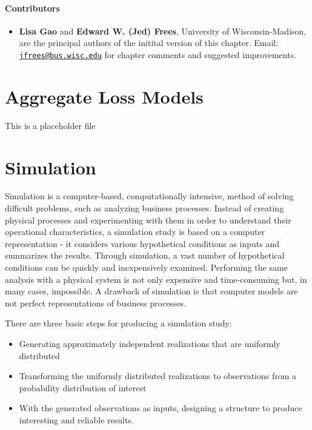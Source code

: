 \documentclass[]{book}
\providecommand{\tightlist}{%
  \setlength{\itemsep}{0pt}\setlength{\parskip}{0pt}}
\theoremstyle{definition}
\theoremstyle{definition}
\theoremstyle{definition}
\theoremstyle{remark}
\begin{document}
\subsubsection*{Contributors}\label{contributors-1}

\begin{itemize}
\tightlist
\item
  \textbf{Lisa Gao} and \textbf{Edward W. (Jed) Frees}, University of
  Wisconsin-Madison, are the principal authors of the initital version
  of this chapter. Email:
  \href{mailto:jfrees@bus.wisc.edu}{\nolinkurl{jfrees@bus.wisc.edu}} for
  chapter comments and suggested improvements.
\end{itemize}

\chapter{Aggregate Loss Models}\label{C:AggLoss}

This is a placeholder file

\chapter{Simulation}\label{simulation}

Simulation is a computer-based, computationally intensive, method of
solving difficult problems, such as analyzing business processes.
Instead of creating physical processes and experimenting with them in
order to understand their operational characteristics, a simulation
study is based on a computer representation - it considers various
hypothetical conditions as inputs and summarizes the results. Through
simulation, a vast number of hypothetical conditions can be quickly and
inexpensively examined. Performing the same analysis with a physical
system is not only expensive and time-consuming but, in many cases,
impossible. A drawback of simulation is that computer models are not
perfect representations of business processes.

There are three basic steps for producing a simulation study:

\begin{itemize}
\item
  Generating approximately independent realizations that are uniformly
  distributed
\item
  Transforming the uniformly distributed realizations to observations
  from a probability distribution of interest
\item
  With the generated observations as inputs, designing a structure to
  produce interesting and reliable results.
\end{itemize}
\end{document}
